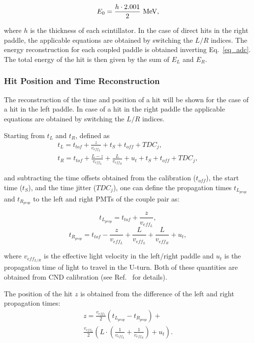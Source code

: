 \begin{equation}
\label{eq_def_e0}
E_0=\frac{h\cdot 2.001}{2}~{\rm MeV},
\end{equation}

\noindent
where $h$ is the thickness of each scintillator. In the case of direct hits in the right paddle, the applicable equations
are obtained by switching the $L/R$ indices. The energy reconstruction for each coupled paddle is obtained inverting
Eq.~\ref{eq_adc}. The total energy of the hit is then given by the sum of $E_L$ and $E_R$.

\subsubsection{Hit Position and Time Reconstruction}

The reconstruction of the time and position of a hit will be shown for the case of a hit in the left paddle. In case
of a hit in the right paddle the applicable equations are obtained by switching the $L/R$ indices.

Starting from $t_L$ and $t_R$, defined as
\begin{multline}
\label{eq_time_hit}
t_L = t_{tof} +\frac{z}{v_{eff_L}} +t_S + t_{off} + TDC_j,\\
t_R = t_{tof} + \frac{L-z}{v_{eff_L}} + \frac{L}{v_{eff_R}} + u_t + t_S + t_{off} + TDC_j,
\end{multline}

\noindent
and subtracting the time offsets obtained from the calibration ($t_{off}$), the start time ($t_S$), and the time
jitter ($TDC_j$), one can define the propagation times $t_{L_{prop}}$ and $t_{R_{prop}}$ to the left and right
PMTs of the couple pair as:

\begin{equation}
t_{L_{prop}} = t_{tof} + \frac{z}{v_{eff_L}},
\end{equation}
\begin{equation}
t_{R_{prop}} = t_{tof} - \frac{z}{v_{eff_L}} + \frac{L}{v_{eff_L}} + \frac{L}{v_{eff_R}} + u_t,
\end{equation}

\noindent
where $v_{eff_{L/R}}$ is the effective light velocity in the left/right paddle and $u_t$ is the propagation time of
light to travel in the U-turn. Both of these quantities are obtained from CND calibration (see Ref.~\cite{cnd-nim}
for details).

The position of the hit $z$ is obtained from the difference of the left and right propagation times:
\begin{multline}
  z = \frac{v_{eff_L}}{2} \left(t_{L_{prop}} - t_{R_{prop}} \right) + \\ \frac{v_{eff_L}}{2} \left( L \cdot \left(\frac{1}{v_{eff_L}}
  + \frac{1}{v_{eff_R}}\right) + u_t \right).
\end{multline}

